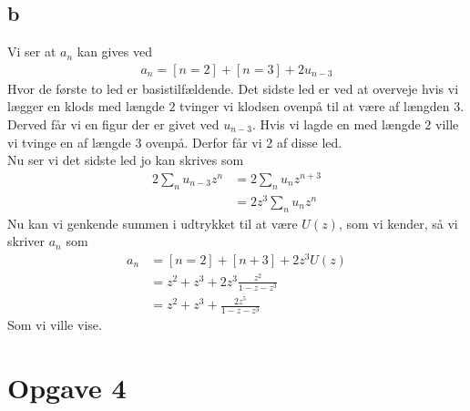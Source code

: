 \documentclass[12pt]{article}
\begin{document}
\subsection*{b}
Vi ser at $a_n$ kan gives ved
\begin{align*}
a_n=[n=2]+[n=3]+2u_{n-3}
\end{align*}
Hvor de første to led er basistilfældende. Det sidste led er ved at overveje hvis vi lægger en klods med længde $2$ tvinger vi klodsen ovenpå til at være af længden $3$. Derved får vi en figur der er givet ved $u_{n-3}$. Hvis vi lagde en med længde $2$ ville vi tvinge en af længde $3$ ovenpå. Derfor får vi 2 af disse led.\\
Nu ser vi det sidste led jo kan skrives som
\begin{align*}
2\sum_n u_{n-3}z^n&=2\sum_n u_{n}z^{n+3} \\
&=2z^3\sum_n u_{n}z^n
\end{align*}
Nu kan vi genkende summen i udtrykket til at være $U(z)$, som vi kender, så vi skriver $a_n$ som
\begin{align*}
a_n&=[n=2]+[n+3]+2z^3U(z) \\
&=z^2+z^3+2z^3\frac{z^2}{1-z-z^3} \\
&=z^2+z^3+\frac{2z^5}{1-z-z^3} 
\end{align*}
Som vi ville vise.

\section*{Opgave 4}
\end{document}
